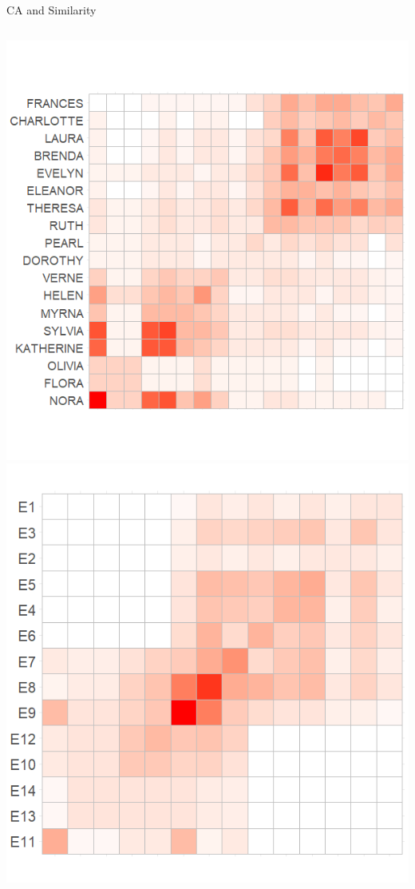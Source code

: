 \documentclass[
  ignorenonframetext,
]{beamer}
\begin{document}
\begin{frame}{CA and Similarity}
\protect\hypertarget{ca-and-similarity-4}{}
\begin{columns}[T]
\begin{column}{0.3\textwidth}
\includegraphics{Plots/ca-sim-p.png}
\includegraphics{Plots/ca-sim-g.png}
\end{column}


\end{columns}
\end{frame}
\end{document}
